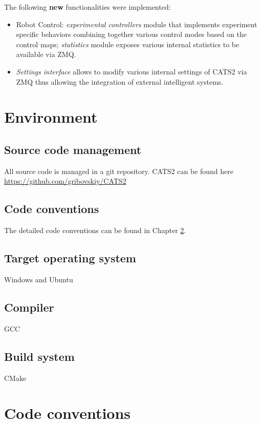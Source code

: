 \documentclass{styles/assisi}
\begin{document}
The following {\bf new} functionalities were implemented:
\begin{itemize}
\item Robot Control: {\it experimental controllers} module that implements experiment specific behaviors combining together various control modes based on the control maps; {\it statistics} module exposes various internal statistics to be available via ZMQ. 
\item {\it Settings interface} allows to modify various internal settings of CATS2 via ZMQ thus allowing the integration of external intelligent systems.
\end{itemize}


\chapter{Environment}\label{chap:Environment}

\section {Source code management}
All source code is managed in a git repository. CATS2 can be found here \url{https://github.com/gribovskiy/CATS2}

\section {Code conventions}
The detailed code conventions can be found in Chapter \ref{chap:code-conventions}.

\section {Target operating system}
Windows and Ubuntu

\section {Compiler}
GCC

\section {Build system}
CMake

\chapter{Code conventions}\label{chap:code-conventions}

\end{document}
